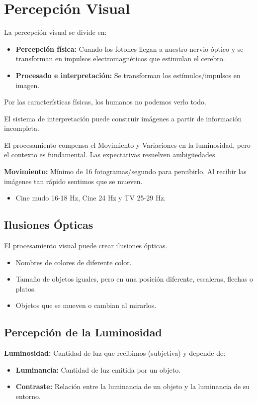 \chapter{Percepción Visual}
La percepción visual se divide en:
\begin{itemize}
    \item \textbf{Percepción física:} Cuando los fotones llegan a nuestro nervio óptico y se transforman en impulsos electromagnéticos que estimulan el cerebro.
    \item \textbf{Procesado e interpretación:} Se transforman los estímulos/impulsos en imagen.
\end{itemize}

Por las características físicas, los humanos no podemos verlo todo.

El sistema de interpretación puede construir imágenes a partir de información incompleta.

El procesamiento compensa el Movimiento y Variaciones en la luminosidad, pero el contexto es fundamental. Las expectativas resuelven ambigüedades.

\textbf{Movimiento:} Mínimo de 16 fotogramas/segundo para percibirlo. Al recibir las imágenes tan rápido sentimos que se mueven. 
\begin{itemize}
    \item Cine mudo 16-18 Hz, Cine 24 Hz y TV 25-29 Hz.
\end{itemize}

\section{Ilusiones Ópticas}
El procesamiento visual puede crear ilusiones ópticas.
\begin{itemize}
    \item Nombres de colores de diferente color.
    \item Tamaño de objetos iguales, pero en una posición diferente, escaleras, flechas o platos.
    \item Objetos que se mueven o cambian al mirarlos.
\end{itemize}

\section{Percepción de la Luminosidad}
\textbf{Luminosidad:} Cantidad de luz que recibimos (subjetiva) y depende de:
\begin{itemize}
    \item \textbf{Luminancia:} Cantidad de luz emitida por un objeto.
    \item \textbf{Contraste:} Relación entre la luminancia de un objeto y la luminancia de su entorno.
\end{itemize}


